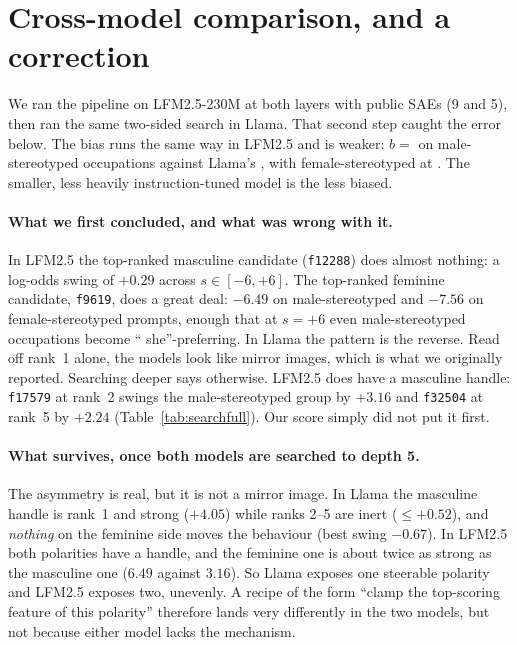 \documentclass{article}
\newcommand{\ff}[1]{\texttt{f#1}}
\begin{document}
\section{Cross-model comparison, and a correction}
\label{sec:crossmodel}

We ran the pipeline on LFM2.5-230M at both layers with public SAEs (9 and 5), then ran the
same two-sided search in Llama. That second step caught the error below. The bias runs the same way in LFM2.5 and is weaker: $b={}$\LfmBaseMale{} \LfmBaseMaleCI{} on
male-stereotyped occupations against Llama's \BaseMale{}, with female-stereotyped at \LfmBaseFemale{}.
The smaller, less heavily instruction-tuned model is the less biased.

\paragraph{What we first concluded, and what was wrong with it.}
In LFM2.5 the top-ranked masculine candidate (\ff{12288}) does almost nothing: a log-odds
swing of $+0.29$ across $s\in[-6,+6]$. The top-ranked feminine candidate, \ff{9619}, does a
great deal: $-6.49$ on male-stereotyped and $-7.56$ on female-stereotyped prompts, enough
that at $s=+6$ even male-stereotyped occupations become `` she''-preferring. In Llama the
pattern is the reverse. Read off rank~1 alone, the models look like mirror images, which
is what we originally reported. Searching deeper says otherwise. LFM2.5 does have a masculine handle: \ff{17579} at rank~2
swings the male-stereotyped group by $+3.16$ and \ff{32504} at rank~5 by $+2.24$
(Table~\ref{tab:searchfull}). Our score simply did not put it first.

\paragraph{What survives, once both models are searched to depth 5.}
The asymmetry is real, but it is not a mirror image. In Llama the masculine handle is
rank~1 and strong ($+4.05$) while ranks 2--5 are inert ($\le +0.52$), and \emph{nothing} on
the feminine side moves the behaviour (best swing $-0.67$). In LFM2.5 both polarities have
a handle, and the feminine one is about twice as strong as the masculine one ($6.49$ against
$3.16$). So Llama exposes one steerable polarity and LFM2.5 exposes two, unevenly. A recipe
of the form ``clamp the top-scoring feature of this polarity'' therefore lands very
differently in the two models, but not because either model lacks the mechanism.
\end{document}
